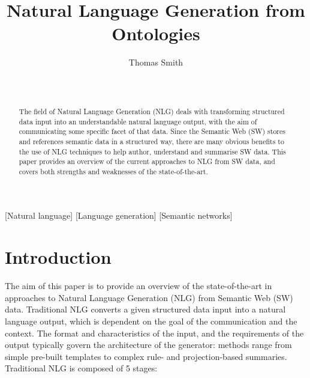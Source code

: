 \documentclass{acm_proc_article-sp}
\begin{document}
\title{Natural Language Generation from Ontologies}


\author{
\alignauthor
Thomas Smith\\
       \\
       \\
}

\maketitle
\begin{abstract}
The field of Natural Language Generation (NLG) deals with transforming structured data input into an understandable natural language output, with the aim of communicating some specific facet of that data. Since the Semantic Web (SW) stores and references semantic data in a structured way, there are many obvious benefits to the use of NLG techniques to help author, understand and summarise SW data. This paper provides an overview of the current approaches to NLG from SW data, and covers both strengths and weaknesses of the state-of-the-art.
\end{abstract}

[Natural language]
[Language generation]
[Semantic networks]




\section{Introduction}
The aim of this paper is to provide an overview of the state-of-the-art in approaches to Natural Language Generation (NLG) from Semantic Web (SW) data. Traditional NLG converts a given structured data input into a natural language output, which is dependent on the goal of the communication and the context. The format and characteristics of the input, and the requirements of the output typically govern the architecture of the generator: methods range from simple pre-built templates to complex rule- and projection-based summaries.\\
Traditional NLG is composed of 5 stages:
\end{document}
